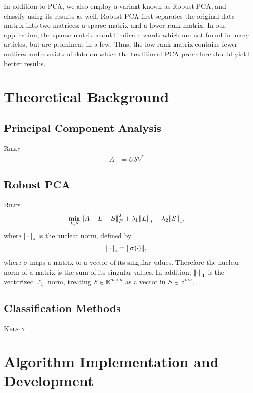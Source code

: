 \documentclass[12pt]{article}
\newcommand{\R}{\mathbb{R}}
\newcommand{\comment}[1]{\textsc{\color[rgb]{1,0,0}#1}}
\begin{document}
In addition to PCA, we also employ a variant known as Robust PCA, and classify using its results as well. Robust PCA first separates the original data matrix into two matrices: a sparse matrix and a lower rank matrix. In our application, the sparse matrix should indicate words which are not found in many articles, but are prominent in a few. Thus, the low rank matrix contains fewer outliers  and consists of data on which the traditional PCA procedure should yield better results. 


\section{Theoretical Background}

\subsection{Principal Component Analysis}
\comment{Riley}
\begin{align}
A &= U S V^*
\label{eq:svd}
\end{align}

\subsection{Robust PCA}
\comment{Riley}
\begin{align}
\min_{L,S} \norm{A-L-S}_{F}^2 + \lambda_1 \norm{L}_* + \lambda_2 \norm{S}_1,
\label{eq:robust_obj}
\end{align}
where $\norm{\cdot}_*$ is the nuclear norm, defined by
\begin{align*}
\norm{\cdot}_* = \norm{\sigma(\cdot)}_1
\end{align*}
where $\sigma$ maps a matrix to a vector of its singular values. Therefore the nuclear norm of a matrix is the sum of its singular values. In addition, $\norm{\cdot}_1$ is the vectorized $\ell_1$ norm, treating $S \in \R^{m \times n}$ as a vector in $S \in \R^{mn}.$

\subsection{Classification Methods}
\comment{Kelsey}
\section{Algorithm Implementation and Development}
\end{document}
